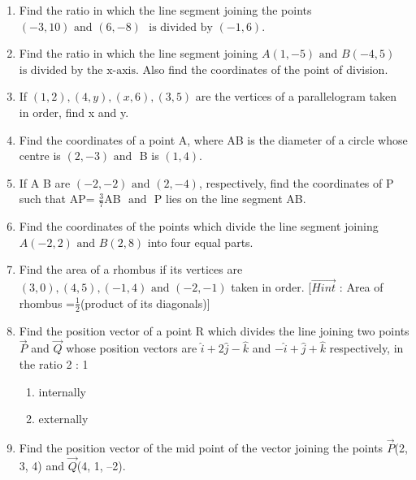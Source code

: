 \begin{enumerate}[label=\thesection.\arabic*,ref=\thesection.\theenumi]
\item Find the ratio in which the line segment joining the points $(-3,10) \text{ and } (6,-8)$ $\text{ is divided by } (-1,6)$.
	\\
		\solution
	
\item Find the ratio in which the line segment joining $A(1,-5) \text{ and } B(-4,5)$ $\text{is divided by the x-axis}$. Also find the coordinates of the point of division.
\item If $(1,2), (4,y), (x,6), (3,5)$ are the vertices of a parallelogram taken in order, find x and y.
	\\
		\solution
	
\item Find the coordinates of a point A, where AB is the diameter of a circle whose centre is $(2,-3) \text{ and }$ B is $(1,4)$.
	\\
		\solution
	
\item If A  B are $(-2,-2) \text{ and } (2,-4)$, respectively, find the coordinates of P such that AP= $\frac {3}{7}$AB $\text{ and }$ P lies on the line segment AB.
	\\
		\solution
	
\item Find the coordinates of the points which divide the line segment joining $A(-2,2) \text{ and } B(2,8)$ into four equal parts.
	\\
		\solution
	
\item Find the area of a rhombus if its vertices are $(3,0), (4,5), (-1,4) \text{ and } (-2,-1)$ taken in order. [$\vec{Hint}$ : Area of rhombus =$\frac {1}{2}$(product of its diagonals)]
	\\
		\solution
	
\item Find the position vector of a point R which divides the line joining two points $\vec{P}$
and $\vec{Q}$ whose position vectors are $\hat{i}+2\hat{j}-\hat{k}$ and $-\hat{i}+\hat{j}+\hat{k}$ respectively, in the
ratio 2 : 1
\begin{enumerate}
    \item  internally
    \item  externally
\end{enumerate}
\solution
		
\item Find the position vector of the mid point of the vector joining the points $\vec{P}$(2, 3, 4)
and $\vec{Q}$(4, 1, –2).

\end{enumerate}
